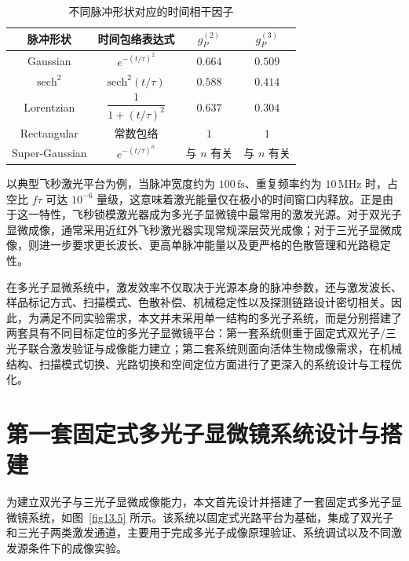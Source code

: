 \begin{table}[htbp]
\centering
\renewcommand{\arraystretch}{1.2}
\begin{tabular}{cccc}
\hline
\textbf{脉冲形状} & \textbf{时间包络表达式} & \textbf{$g_P^{(2)}$} & \textbf{$g_P^{(3)}$} \\ \hline
Gaussian
& $e^{-(t/\tau)^2}$
& $0.664$
& $0.509$ \\

$\mathrm{sech}^2$
& $\mathrm{sech}^2(t/\tau)$
& $0.588$
& $0.414$ \\

Lorentzian
& $\dfrac{1}{1+(t/\tau)^2}$
& $0.637$
& $0.304$ \\

Rectangular
& 常数包络
& $1$
& $1$ \\

Super-Gaussian
& $e^{-(t/\tau)^n}$
& 与 $n$ 有关
& 与 $n$ 有关 \\ \hline
\end{tabular}
\caption{不同脉冲形状对应的时间相干因子}
\label{Table2.2}
\end{table}

以典型飞秒激光平台为例，当脉冲宽度约为 $100\,\mathrm{fs}$、重复频率约为 $10\,\mathrm{MHz}$ 时，占空比 $f\tau$ 可达 $10^{-6}$ 量级，这意味着激光能量仅在极小的时间窗口内释放。正是由于这一特性，飞秒锁模激光器成为多光子显微镜中最常用的激发光源。对于双光子显微成像，通常采用近红外飞秒激光器实现常规深层荧光成像；对于三光子显微成像，则进一步要求更长波长、更高单脉冲能量以及更严格的色散管理和光路稳定性。

在多光子显微系统中，激发效率不仅取决于光源本身的脉冲参数，还与激发波长、样品标记方式、扫描模式、色散补偿、机械稳定性以及探测链路设计密切相关。因此，为满足不同实验需求，本文并未采用单一结构的多光子系统，而是分别搭建了两套具有不同目标定位的多光子显微镜平台：第一套系统侧重于固定式双光子/三光子联合激发验证与成像能力建立；第二套系统则面向活体生物成像需求，在机械结构、扫描模式切换、光路切换和空间定位方面进行了更深入的系统设计与工程优化。

\section{第一套固定式多光子显微镜系统设计与搭建}\label{4.2}

为建立双光子与三光子显微成像能力，本文首先设计并搭建了一套固定式多光子显微镜系统，如图~\ref{fig13.5} 所示。该系统以固定式光路平台为基础，集成了双光子和三光子两类激发通道，主要用于完成多光子成像原理验证、系统调试以及不同激发源条件下的成像实验。

